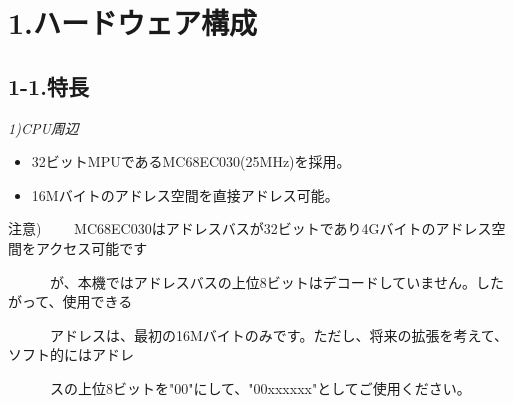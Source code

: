 \documentclass[twoside,a4paper,12pt]{article}
\begin{document}

\newpage

\cfoot{\ \\[-15mm]
- \thepage \ -}

\section*{1.ハードウェア構成}

\subsection*{1-1.特長}

\renewcommand{\labelitemi}{・}
\setlength{\parindent}{20mm}
\setlength{\parskip}{0mm}
\small
\itshape
1)CPU周辺
\begin{itemize}[leftmargin=30mm, itemsep=-1mm, topsep=1mm]
\item
32ビットMPUであるMC68EC030(25MHz)を採用。
\item
16Mバイトのアドレス空間を直接アドレス可能。
\end{itemize}

注意) \ \ \ \ MC68EC030はアドレスバスが32ビットであり4Gバイトのアドレス空間をアクセス可能です

\ \ \ \ \ \ が、本機ではアドレスバスの上位8ビットはデコードしていません。したがって、使用できる

\ \ \ \ \ \ アドレスは、最初の16Mバイトのみです。ただし、将来の拡張を考えて、ソフト的にはアドレ

\ \ \ \ \ \  スの上位8ビットを"00"にして、"00xxxxxx"としてご使用ください。
\end{document}
